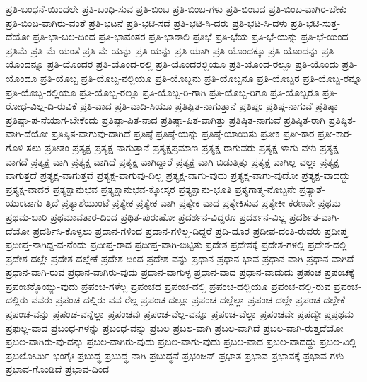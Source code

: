 {ಪ್ರತಿ-ಬಂಧನೆ-ಯಿಂದಲೇ
ಪ್ರತಿ-ಬಂಧಿ-ಸುವ
ಪ್ರತಿ-ಬಿಂಬ
ಪ್ರತಿ-ಬಿಂಬ-ಗಳು
ಪ್ರತಿ-ಬಿಂಬದ
ಪ್ರತಿ-ಬಿಂಬ-ವಾಗಿರ-ಬೇಕು
ಪ್ರತಿ-ಬಿಂಬ-ವಾಗಿರು-ವಂತೆ
ಪ್ರತಿ-ಭಟನೆ
ಪ್ರತಿ-ಭಟಿ-ಸದೆ
ಪ್ರತಿ-ಭಟಿ-ಸಿ-ದರು
ಪ್ರತಿ-ಭಟಿ-ಸಿ-ದಳು
ಪ್ರತಿ-ಭಟಿ-ಸುತ್ತ-ದೆಯೋ
ಪ್ರತಿ-ಭಾ-ಬಲ-ದಿಂದ
ಪ್ರತಿ-ಭಾವಂತರ
ಪ್ರತಿ-ಭಾಶಾಲಿ
ಪ್ರತಿಭೆ
ಪ್ರತಿ-ಭೆಯ
ಪ್ರತಿ-ಭೆ-ಯನ್ನು
ಪ್ರತಿ-ಭೆ-ಯಿಂದ
ಪ್ರತಿಮೆ
ಪ್ರತಿ-ಮೆ-ಯಂತೆ
ಪ್ರತಿ-ಮೆ-ಯನ್ನು
ಪ್ರತಿ-ಯನ್ನು
ಪ್ರತಿ-ಯಾಗಿ
ಪ್ರತಿ-ಯೊಂದಕ್ಕೂ
ಪ್ರತಿ-ಯೊಂದನ್ನು
ಪ್ರತಿ-ಯೊಂದನ್ನೂ
ಪ್ರತಿ-ಯೊಂದರ
ಪ್ರತಿ-ಯೊಂದ-ರಲ್ಲಿ
ಪ್ರತಿ-ಯೊಂದರಲ್ಲಿಯೂ
ಪ್ರತಿ-ಯೊಂದ-ರಲ್ಲೂ
ಪ್ರತಿ-ಯೊಂದು
ಪ್ರತಿ-ಯೊಂದೂ
ಪ್ರತಿ-ಯೊಬ್ಬ
ಪ್ರತಿ-ಯೊಬ್ಬ-ನಲ್ಲಿಯೂ
ಪ್ರತಿ-ಯೊಬ್ಬನು
ಪ್ರತಿ-ಯೊಬ್ಬನೂ
ಪ್ರತಿ-ಯೊಬ್ಬರ
ಪ್ರತಿ-ಯೊಬ್ಬ-ರನ್ನೂ
ಪ್ರತಿ-ಯೊಬ್ಬ-ರಲ್ಲಿಯೂ
ಪ್ರತಿ-ಯೊಬ್ಬ-ರಲ್ಲೂ
ಪ್ರತಿ-ಯೊಬ್ಬ-ರಿ-ಗಾಗಿ
ಪ್ರತಿ-ಯೊಬ್ಬ-ರಿಗೂ
ಪ್ರತಿ-ಯೊಬ್ಬರೂ
ಪ್ರತಿ-ರೋಧ-ವಿಲ್ಲ-ದಿ-ರುವಿಕೆ
ಪ್ರತಿ-ವಾದ
ಪ್ರತಿ-ವಾದಿ-ಸಿಯೂ
ಪ್ರತಿಷ್ಟಿತ-ನಾಗುತ್ತಾನೆ
ಪ್ರತಿಷ್ಠಂ
ಪ್ರತಿಷ್ಠ-ನಾಗುವೆ
ಪ್ರತಿಷ್ಠಾ
ಪ್ರತಿಷ್ಠಾ-ಪ-ನೆಯಾಗ-ಬೇಕೆಂದು
ಪ್ರತಿಷ್ಠಾ-ಪಿತ-ನಾದ
ಪ್ರತಿಷ್ಠಾ-ಪಿತ-ವಾಗಿತ್ತು
ಪ್ರತಿಷ್ಠಿತ-ನಾಗುವೆ
ಪ್ರತಿಷ್ಠಿತ-ರಾಗಿ
ಪ್ರತಿಷ್ಠಿತ-ವಾಗಿ-ದೆಯೋ
ಪ್ರತಿಷ್ಠಿತ-ವಾಗುವು-ದಾಗಿದೆ
ಪ್ರತಿಷ್ಠೆ
ಪ್ರತಿಷ್ಠೆ-ಯನ್ನು
ಪ್ರತಿಷ್ಠೆ-ಯಾಯಿತು
ಪ್ರತೀಕ
ಪ್ರತೀ-ಕಾರ
ಪ್ರತೀ-ಕಾರ-ಗೊಳಿ-ಸಲು
ಪ್ರತೀತಂ
ಪ್ರತ್ಯಕ್ಷ
ಪ್ರತ್ಯಕ್ಷ-ನಾಗುತ್ತಾನೆ
ಪ್ರತ್ಯಕ್ಷಪ್ರಮಾಣ
ಪ್ರತ್ಯಕ್ಷ-ರಾಗುವರು
ಪ್ರತ್ಯಕ್ಷ-ಳಾಗು-ವಳು
ಪ್ರತ್ಯಕ್ಷ-ವಾಗದೆ
ಪ್ರತ್ಯಕ್ಷ-ವಾಗಿ
ಪ್ರತ್ಯಕ್ಷ-ವಾಗಿದೆ
ಪ್ರತ್ಯಕ್ಷ-ವಾಗಿದ್ದಾರೆ
ಪ್ರತ್ಯಕ್ಷ-ವಾಗಿ-ಬಿಡುತ್ತಿತ್ತು
ಪ್ರತ್ಯಕ್ಷ-ವಾಗಿಲ್ಲ-ವಲ್ಲಾ
ಪ್ರತ್ಯಕ್ಷ-ವಾಗುತ್ತದೆ
ಪ್ರತ್ಯಕ್ಷ-ವಾಗುತ್ತವೆ
ಪ್ರತ್ಯಕ್ಷ-ವಾಗುವು-ದಿಲ್ಲ
ಪ್ರತ್ಯಕ್ಷ-ವಾಗು-ವುದು
ಪ್ರತ್ಯಕ್ಷ-ವಾಗು-ವುದೋ
ಪ್ರತ್ಯಕ್ಷ-ವಾದದ್ದು
ಪ್ರತ್ಯಕ್ಷ-ವಾದರೆ
ಪ್ರತ್ಯಕ್ಷಾನುಭವ
ಪ್ರತ್ಯಕ್ಷಾನುಭವ-ಕ್ಕೋಸ್ಕರ
ಪ್ರತ್ಯಕ್ಷಾನು-ಭೂತಿ
ಪ್ರತ್ಯಗಾತ್ಮ-ನೊಬ್ಬನೇ
ಪ್ರತ್ಯಾಶೆ-ಯುಂಟಾಗು-ತ್ತಿದೆ
ಪ್ರತ್ಯಾಶೆಯುಂಟೆ
ಪ್ರತ್ಯೇಕ
ಪ್ರತ್ಯೇಕ-ವಾಗಿ
ಪ್ರತ್ಯೇಕ-ವಾದ
ಪ್ರತ್ಯೇಕಿಸುವ
ಪ್ರತ್ಯೇಕೀ-ಕರಣವೇ
ಪ್ರಥಮ
ಪ್ರಥಮ-ಬಾರಿ
ಪ್ರಥಮಾವತಾರ-ದಿಂದ
ಪ್ರಥಿತ-ಪುರುಷೋ
ಪ್ರದರ್ಶನ-ವಿದ್ದರೂ
ಪ್ರದರ್ಶನ-ವಿಲ್ಲ
ಪ್ರದರ್ಶಿತ-ವಾಗಿ-ದೆಯೋ
ಪ್ರದರ್ಶಿಸಿ-ಕೊಳ್ಳಲು
ಪ್ರದಾನ-ಗಳಿಂದ
ಪ್ರದಾನ-ಗಳಿಲ್ಲ-ದಿದ್ದರೆ
ಪ್ರದಿ-ದೂರ
ಪ್ರದೀಪ-ದಂತಿ-ರುವರು
ಪ್ರದೀಪ್ತ
ಪ್ರದೀಪ್ತ-ನಾಗಿದ್ದ-ವ-ನೆಂದು
ಪ್ರದೀಪ್ತ-ರಾದ
ಪ್ರದೀಪ್ತ-ವಾಗಿ-ಬಿಟ್ಟಿತು
ಪ್ರದೇಶ
ಪ್ರದೇಶಕ್ಕೆ
ಪ್ರದೇಶ-ಗಳಲ್ಲಿ
ಪ್ರದೇಶ-ದಲ್ಲಿ
ಪ್ರದೇಶ-ದಲ್ಲೇ
ಪ್ರದೇಶ-ದಲ್ಲೇಕೆ
ಪ್ರದೇಶ-ದಿಂದ
ಪ್ರದೇಶ-ವನ್ನು
ಪ್ರಧಾನ
ಪ್ರಧಾನ-ಭಾವ
ಪ್ರಧಾನ-ವಾಗಿ
ಪ್ರಧಾನ-ವಾಗಿದೆ
ಪ್ರಧಾನ-ವಾಗಿ-ರುವ
ಪ್ರಧಾನ-ವಾಗಿರು-ವುದು
ಪ್ರಧಾನ-ವಾಗುಳ್ಳ
ಪ್ರಧಾನ-ವಾದ
ಪ್ರಧಾನ-ವಾದುದು
ಪ್ರಪಂಚ
ಪ್ರಪಂಚಕ್ಕೆ
ಪ್ರಪಂಚಕ್ಕೊಯ್ಯು-ವುದು
ಪ್ರಪಂಚ-ಗಳೆಲ್ಲ
ಪ್ರಪಂಚದ
ಪ್ರಪಂಚ-ದಲ್ಲಿ
ಪ್ರಪಂಚ-ದಲ್ಲಿಯೂ
ಪ್ರಪಂಚ-ದಲ್ಲಿ-ರುವ
ಪ್ರಪಂಚ-ದಲ್ಲಿರು-ವವರು
ಪ್ರಪಂಚ-ದಲ್ಲಿರು-ವವ-ರೆಲ್ಲ
ಪ್ರಪಂಚ-ದಲ್ಲೂ
ಪ್ರಪಂಚ-ದಲ್ಲೆಲ್ಲಾ
ಪ್ರಪಂಚ-ದಲ್ಲೇ
ಪ್ರಪಂಚ-ದಲ್ಲೇಕೆ
ಪ್ರಪಂಚ-ವನ್ನು
ಪ್ರಪಂಚ-ವನ್ನೆಲ್ಲಾ
ಪ್ರಪಂಚವು
ಪ್ರಪಂಚ-ವೆಲ್ಲ-ವನ್ನೂ
ಪ್ರಪಂಚ-ವೆಲ್ಲಾ
ಪ್ರಪಂಚವೇ
ಪ್ರಪದ್ಯೇ
ಪ್ರಪ್ರಥಮ
ಪ್ರಫುಲ್ಲ-ವಾದ
ಪ್ರಬಂಧ-ಗಳನ್ನು
ಪ್ರಬಂಧ-ವನ್ನು
ಪ್ರಬಲ
ಪ್ರಬಲ-ವಾಗಿ
ಪ್ರಬಲ-ವಾಗಿದೆ
ಪ್ರಬಲ-ವಾಗಿ-ರುತ್ತದೆಯೋ
ಪ್ರಬಲ-ವಾಗಿರು-ವು-ದನ್ನು
ಪ್ರಬಲ-ವಾಗಿರು-ವುದು
ಪ್ರಬಲ-ವಾಗು-ವುದು
ಪ್ರಬಲ-ವಾದ
ಪ್ರಬಲ-ವಾದದ್ದು
ಪ್ರಬಲ-ವಿಲ್ಲಿ
ಪ್ರಬಲೋರ್ಮಿ-ಭಂಗೈಃ
ಪ್ರಬುದ್ಧ
ಪ್ರಬುದ್ಧ-ನಾಗಿ
ಪ್ರಬುದ್ಧನೆ
ಪ್ರಭಂಜನ್
ಪ್ರಭಾತ
ಪ್ರಭಾವ
ಪ್ರಭಾವಕ್ಕೆ
ಪ್ರಭಾವ-ಗಳು
ಪ್ರಭಾವ-ಗೊಂಡಿದೆ
ಪ್ರಭಾವ-ದಿಂದ
}
